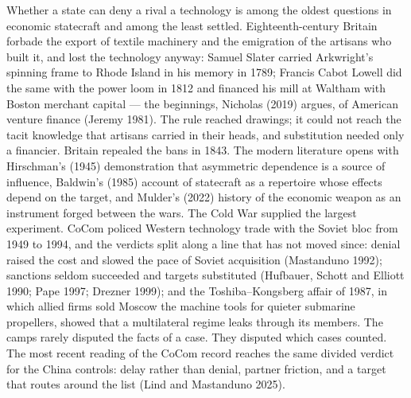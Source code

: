 \documentclass[12pt]{article}
\begin{document}
Whether a state can deny a rival a technology is among the oldest questions in economic statecraft and among the least settled. Eighteenth-century Britain forbade the export of textile machinery and the emigration of the artisans who built it, and lost the technology anyway: Samuel Slater carried Arkwright's spinning frame to Rhode Island in his memory in 1789; Francis Cabot Lowell did the same with the power loom in 1812 and financed his mill at Waltham with Boston merchant capital --- the beginnings, Nicholas (2019) argues, of American venture finance (Jeremy 1981). The rule reached drawings; it could not reach the tacit knowledge that artisans carried in their heads, and substitution needed only a financier. Britain repealed the bans in 1843. The modern literature opens with Hirschman's (1945) demonstration that asymmetric dependence is a source of influence, Baldwin's (1985) account of statecraft as a repertoire whose effects depend on the target, and Mulder's (2022) history of the economic weapon as an instrument forged between the wars. The Cold War supplied the largest experiment. CoCom policed Western technology trade with the Soviet bloc from 1949 to 1994, and the verdicts split along a line that has not moved since: denial raised the cost and slowed the pace of Soviet acquisition (Mastanduno 1992); sanctions seldom succeeded and targets substituted (Hufbauer, Schott and Elliott 1990; Pape 1997; Drezner 1999); and the Toshiba--Kongsberg affair of 1987, in which allied firms sold Moscow the machine tools for quieter submarine propellers, showed that a multilateral regime leaks through its members. The camps rarely disputed the facts of a case. They disputed which cases counted. The most recent reading of the CoCom record reaches the same divided verdict for the China controls: delay rather than denial, partner friction, and a target that routes around the list (Lind and Mastanduno 2025).
\end{document}
